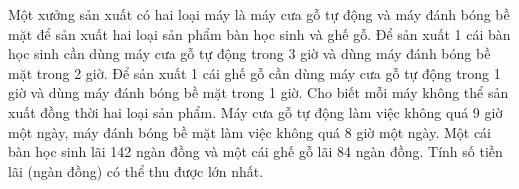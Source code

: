 \begin{ex}
 Một xưởng sản xuất có hai loại máy là máy cưa gỗ tự động và máy đánh bóng bề mặt để sản xuất hai loại sản phẩm bàn học sinh và ghế gỗ. Để sản xuất 1 cái bàn học sinh cần dùng máy cưa gỗ tự động trong 3 giờ và dùng máy đánh bóng bề mặt trong 2 giờ. Để sản xuất 1 cái ghế gỗ cần dùng máy cưa gỗ tự động trong 1 giờ và dùng máy đánh bóng bề mặt trong 1 giờ. Cho biết mỗi máy không thể sản xuất đồng thời hai loại sản phẩm. Máy cưa gỗ tự động làm việc không quá 9 giờ một ngày, máy đánh bóng bề mặt làm việc không quá 8 giờ một ngày. Một cái bàn học sinh lãi 142 ngàn đồng và một cái ghế gỗ lãi 84 ngàn đồng. Tính số tiền lãi (ngàn đồng) có thể thu được lớn nhất.


\end{ex}

